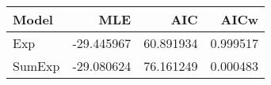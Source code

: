 \begin{tabular}{lrrr}
\toprule
  Model &        MLE &        AIC &      AICw \\
\midrule
    Exp & -29.445967 &  60.891934 &  0.999517 \\
 SumExp & -29.080624 &  76.161249 &  0.000483 \\
\bottomrule
\end{tabular}

